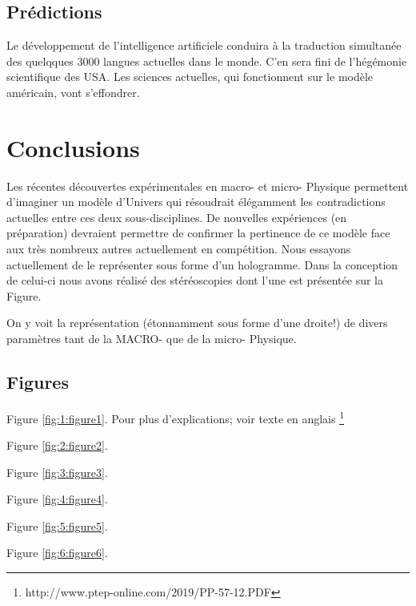 \documentclass[a4paper,12pt]{article}
\begin{document}
\subsection {Prédictions}
Le développement de l'intelligence artificiele conduira à la traduction simultanée des quelqques 3000 langues actuelles dans le monde. C'en sera fini de l'hégémonie scientifique des USA.
Les sciences actuelles, qui fonctionnent sur le modèle américain, vont s'effondrer. 









\section{Conclusions}
\label{sec:headings}

Les récentes découvertes expérimentales en macro- et micro- Physique permettent d'imaginer un modèle d'Univers qui résoudrait élégamment les contradictions actuelles entre ces deux sous-disciplines. De nouvelles expériences (en préparation) devraient permettre de confirmer la pertinence de ce modèle face aux très nombreux autres actuellement en compétition. Nous essayons actuellement de le représenter sous forme d'un hologramme. Dans la conception de celui-ci nous avons réalisé des stéréoscopies dont l'une est présentée sur la Figure.

On y voit la représentation (étonnamment sous forme d'une droite!) de divers paramètres tant de la MACRO- que de la micro- Physique.


\subsection{Figures}

Figure \ref{fig:1:figure1}. Pour plus d'explications; voir texte en anglais \footnote{http://www.ptep-online.com/2019/PP-57-12.PDF}

Figure \ref{fig:2:figure2}.

Figure \ref{fig:3:figure3}.

Figure \ref{fig:4:figure4}.

Figure \ref{fig:5:figure5}.

Figure \ref{fig:6:figure6}.
\end{document}
